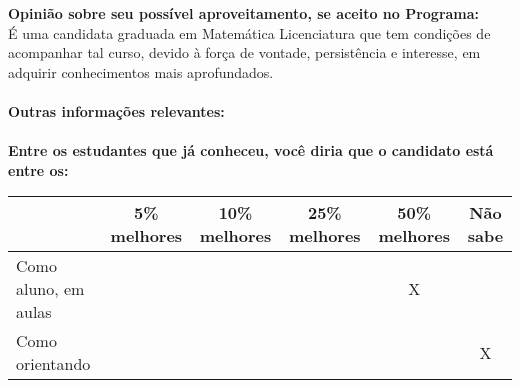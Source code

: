 \documentclass[11pt]{article}
\begin{document}
\textbf{Opinião sobre seu possível aproveitamento, se aceito no Programa:}
\\É uma candidata graduada em Matemática Licenciatura que tem condições de acompanhar tal curso, devido à força de vontade, persistência e interesse, em adquirir conhecimentos mais aprofundados.\\ 
\\
\textbf{Outras informações relevantes:} \\
\\[0.3cm]
\textbf{Entre os estudantes que já conheceu, você diria que o candidato está entre os:}
\\
\begin{tabular}{|l|c|c|c|c|c|}
\hline
 & 5\% melhores & 10\% melhores & 25\% melhores & 50\% melhores & Não sabe \\
\hline
Como aluno, em aulas &  &  &  & X & \\
\hline
Como orientando &  &  &  &  & X\\
\hline
\end{tabular}
\end{document}
